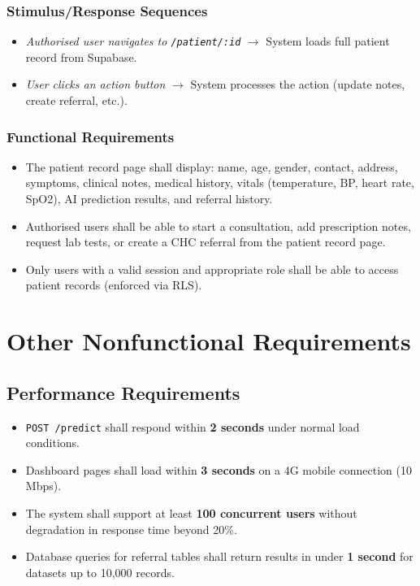 \documentclass[12pt,a4paper]{article}
\begin{document}
\subsubsection{Stimulus/Response Sequences}
\begin{itemize}
    \item \textit{Authorised user navigates to \texttt{/patient/:id}} $\rightarrow$ System loads full patient record from Supabase.
    \item \textit{User clicks an action button} $\rightarrow$ System processes the action (update notes, create referral, etc.).
\end{itemize}

\subsubsection{Functional Requirements}
\begin{itemize}
    \item[\texttt{REQ-PAT-01}] The patient record page shall display: name, age, gender, contact, address, symptoms, clinical notes, medical history, vitals (temperature, BP, heart rate, SpO2), AI prediction results, and referral history.
    \item[\texttt{REQ-PAT-02}] Authorised users shall be able to start a consultation, add prescription notes, request lab tests, or create a CHC referral from the patient record page.
    \item[\texttt{REQ-PAT-03}] Only users with a valid session and appropriate role shall be able to access patient records (enforced via RLS).
\end{itemize}

\section{Other Nonfunctional Requirements}

\subsection{Performance Requirements}
\begin{itemize}
    \item \texttt{POST /predict} shall respond within \textbf{2 seconds} under normal load conditions.
    \item Dashboard pages shall load within \textbf{3 seconds} on a 4G mobile connection (10 Mbps).
    \item The system shall support at least \textbf{100 concurrent users} without degradation in response time beyond 20\%.
    \item Database queries for referral tables shall return results in under \textbf{1 second} for datasets up to 10,000 records.
\end{itemize}
\end{document}
